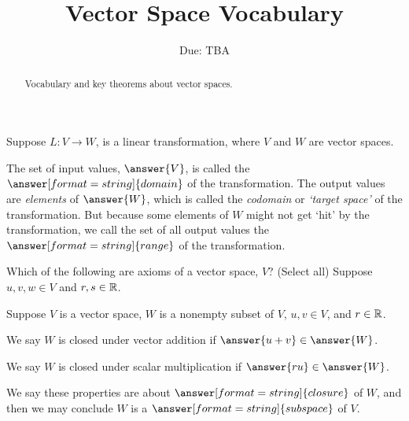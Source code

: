 \documentclass{ximera}
\title{Vector Space Vocabulary}
\author{\phantom{Dr. Findell}}
\date{Due: TBA}
\begin{document}
\begin{abstract}
Vocabulary and key theorems about vector spaces.   
\end{abstract}
\maketitle



\begin{question}
Suppose $L: V\to W$, is a linear transformation, where $V$ and $W$ are vector spaces.  

The set of input values, $\answer{V}$, is called the $\answer[format=string]{domain}$ of the transformation.  The output values are \emph{elements} of $\answer{W}$, which is called the \emph{codomain} or \emph{`target space'} of the transformation.  But because some elements of $W$ 
might not get `hit' by the transformation, we call the set of all output values the $\answer[format=string]{range}$ of the transformation.  
\end{question}

\begin{question}
Which of the following are axioms of a vector space, $V$?  (Select all) 
Suppose $u,v,w\in V$ and $r,s\in{\mathbb R}$.
\begin{selectAll}
\end{selectAll}
\end{question}

\begin{question}
Suppose $V$ is a vector space, $W$ is a nonempty subset of $V$, $u,v\in V$, and $r\in{\mathbb R}$.  

We say $W$ is closed under vector addition if $\answer{u+v}\in \answer{W}$. 

We say $W$ is closed under scalar multiplication if $\answer{ru}\in \answer{W}$.  %

We say these properties are about $\answer[format=string]{closure}$ of $W$, and then 
we may conclude $W$ is a $\answer[format=string]{subspace}$ of $V$.  
\end{question}
\end{document}
